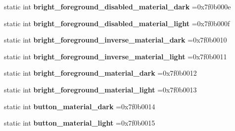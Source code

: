 \begin{DoxyCompactItemize}
static int {\bfseries bright\+\_\+foreground\+\_\+disabled\+\_\+material\+\_\+dark} =0x7f0b000e
\item 
\mbox{\label{classandroid_1_1support_1_1v7_1_1mediarouter_1_1R_1_1color_af8879e1f4a6b7e85b7f822fdc075b684}} 
static int {\bfseries bright\+\_\+foreground\+\_\+disabled\+\_\+material\+\_\+light} =0x7f0b000f
\item 
\mbox{\label{classandroid_1_1support_1_1v7_1_1mediarouter_1_1R_1_1color_a6c87eec14632871f288a2e390a4f2e0e}} 
static int {\bfseries bright\+\_\+foreground\+\_\+inverse\+\_\+material\+\_\+dark} =0x7f0b0010
\item 
\mbox{\label{classandroid_1_1support_1_1v7_1_1mediarouter_1_1R_1_1color_ab4898682cce0df16d1f1939423865abf}} 
static int {\bfseries bright\+\_\+foreground\+\_\+inverse\+\_\+material\+\_\+light} =0x7f0b0011
\item 
\mbox{\label{classandroid_1_1support_1_1v7_1_1mediarouter_1_1R_1_1color_a53c5886596a517da07dace5e4991552b}} 
static int {\bfseries bright\+\_\+foreground\+\_\+material\+\_\+dark} =0x7f0b0012
\item 
\mbox{\label{classandroid_1_1support_1_1v7_1_1mediarouter_1_1R_1_1color_ab8b57f54642b1913c87691d61ad18907}} 
static int {\bfseries bright\+\_\+foreground\+\_\+material\+\_\+light} =0x7f0b0013
\item 
\mbox{\label{classandroid_1_1support_1_1v7_1_1mediarouter_1_1R_1_1color_a1784f50ef267a9783fb1d4d8324a0f1a}} 
static int {\bfseries button\+\_\+material\+\_\+dark} =0x7f0b0014
\item 
\mbox{\label{classandroid_1_1support_1_1v7_1_1mediarouter_1_1R_1_1color_a425e59cf430cd22f7d415b9f052a95e7}} 
static int {\bfseries button\+\_\+material\+\_\+light} =0x7f0b0015
\item 
\mbox{\label{classandroid_1_1support_1_1v7_1_1mediarouter_1_1R_1_1color_ae9961b90da5ea58c0db2c06750e39f0d}} 

\end{DoxyCompactItemize}
